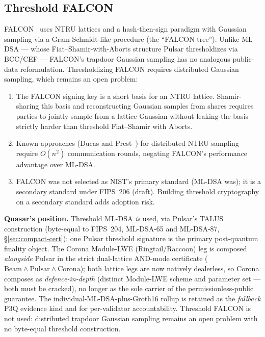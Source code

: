 \subsection{Threshold FALCON}

FALCON~\cite{falcon-spec} uses NTRU lattices and a hash-then-sign
paradigm with Gaussian sampling via a Gram-Schmidt-like procedure
(the ``FALCON tree'').  Unlike ML-DSA --- whose Fiat--Shamir-with-Aborts
structure Pulsar thresholdizes via BCC/CEF --- FALCON's trapdoor
Gaussian sampling has no analogous public-data reformulation.
Thresholdizing FALCON requires distributed Gaussian sampling, which
remains an open problem:

\begin{enumerate}[nosep]
  \item The FALCON signing key is a short basis for an NTRU lattice.
    Shamir-sharing this basis and reconstructing Gaussian samples from
    shares requires parties to jointly sample from a lattice Gaussian
    without leaking the basis---strictly harder than threshold
    Fiat--Shamir with Aborts.

  \item Known approaches (Ducas and Prest~\cite{ducas2016}) for
    distributed NTRU sampling require $O(n^2)$ communication rounds,
    negating FALCON's performance advantage over ML-DSA.

  \item FALCON was not selected as NIST's primary standard (ML-DSA
    was); it is a secondary standard under FIPS~206 (draft).  Building
    threshold cryptography on a secondary standard adds adoption risk.
\end{enumerate}

\textbf{Quasar's position.}  Threshold ML-DSA \emph{is} used, via
Pulsar's TALUS construction (byte-equal to FIPS~204, ML-DSA-65 and
ML-DSA-87, \S\ref{sec:compact-cert}): one Pulsar threshold signature is
the primary post-quantum finality object.  The Corona Module-LWE
(Ringtail/Raccoon) leg is composed \emph{alongside} Pulsar in the strict
dual-lattice AND-mode certificate
($\mathrm{Beam} \wedge \mathrm{Pulsar} \wedge \mathrm{Corona}$); both
lattice legs are now natively dealerless, so Corona composes as
\emph{defence-in-depth} (distinct Module-LWE scheme and parameter set ---
both must be cracked), no longer as the sole carrier of the
permissionless-public guarantee.  The individual-ML-DSA-plus-Groth16
rollup is retained as the
\emph{fallback} P3Q evidence kind and for per-validator accountability.
Threshold FALCON is not used: distributed trapdoor Gaussian sampling
remains an open problem with no byte-equal threshold construction.
